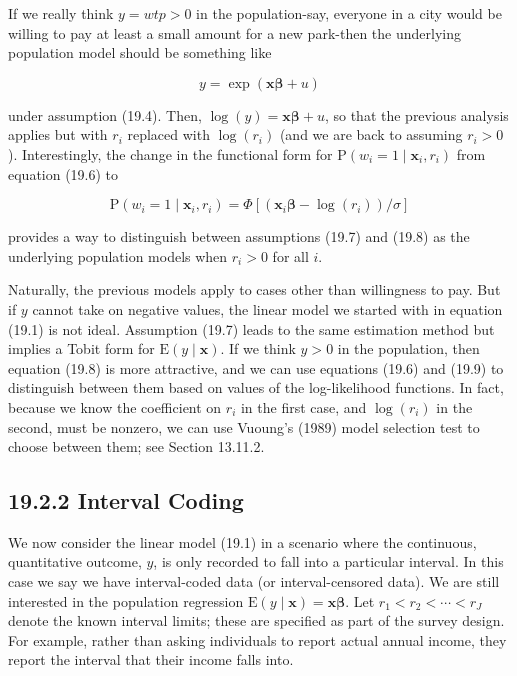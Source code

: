 \documentclass[10pt]{article}
\begin{document}
If we really think $y=w t p>0$ in the population-say, everyone in a city would be willing to pay at least a small amount for a new park-then the underlying population model should be something like


\begin{equation*}
y=\exp (\mathbf{x} \boldsymbol{\beta}+u) \tag{19.8}
\end{equation*}


under assumption (19.4). Then, $\log (y)=\mathbf{x} \boldsymbol{\beta}+u$, so that the previous analysis applies but with $r_{i}$ replaced with $\log \left(r_{i}\right)$ (and we are back to assuming $r_{i}>0$ ). Interestingly, the change in the functional form for $\mathrm{P}\left(w_{i}=1 \mid \mathbf{x}_{i}, r_{i}\right)$ from equation (19.6) to


\begin{equation*}
\mathrm{P}\left(w_{i}=1 \mid \mathbf{x}_{i}, r_{i}\right)=\Phi\left[\left(\mathbf{x}_{i} \boldsymbol{\beta}-\log \left(r_{i}\right)\right) / \sigma\right] \tag{19.9}
\end{equation*}


provides a way to distinguish between assumptions (19.7) and (19.8) as the underlying population models when $r_{i}>0$ for all $i$.

Naturally, the previous models apply to cases other than willingness to pay. But if $y$ cannot take on negative values, the linear model we started with in equation (19.1) is not ideal. Assumption (19.7) leads to the same estimation method but implies a Tobit form for $\mathrm{E}(y \mid \mathbf{x})$. If we think $y>0$ in the population, then equation (19.8) is more attractive, and we can use equations (19.6) and (19.9) to distinguish between them based on values of the log-likelihood functions. In fact, because we know the coefficient on $r_{i}$ in the first case, and $\log \left(r_{i}\right)$ in the second, must be nonzero, we can use Vuoung's (1989) model selection test to choose between them; see Section 13.11.2.

\subsection*{19.2.2 Interval Coding}
We now consider the linear model (19.1) in a scenario where the continuous, quantitative outcome, $y$, is only recorded to fall into a particular interval. In this case we say we have interval-coded data (or interval-censored data). We are still interested in the population regression $\mathrm{E}(y \mid \mathbf{x})=\mathbf{x} \boldsymbol{\beta}$. Let $r_{1}<r_{2}<\cdots<r_{J}$ denote the known interval limits; these are specified as part of the survey design. For example, rather than asking individuals to report actual annual income, they report the interval that their income falls into.
\end{document}
